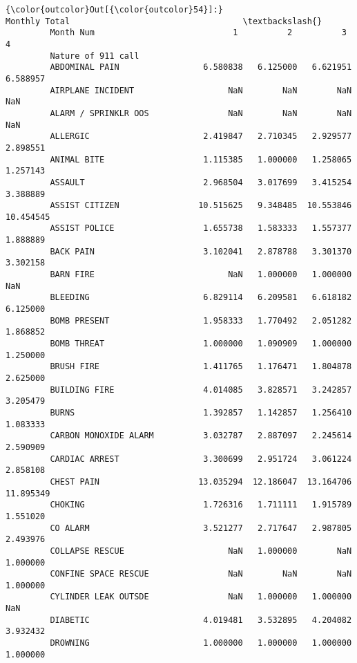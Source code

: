 \documentclass[11pt]{article}
\begin{document}
\begin{Verbatim}[commandchars=\\\{\}]
{\color{outcolor}Out[{\color{outcolor}54}]:}                           Monthly Total                                   \textbackslash{}
         Month Num                            1          2          3          4    
         Nature of 911 call                                                         
         ABDOMINAL PAIN                 6.580838   6.125000   6.621951   6.588957   
         AIRPLANE INCIDENT                   NaN        NaN        NaN        NaN   
         ALARM / SPRINKLR OOS                NaN        NaN        NaN        NaN   
         ALLERGIC                       2.419847   2.710345   2.929577   2.898551   
         ANIMAL BITE                    1.115385   1.000000   1.258065   1.257143   
         ASSAULT                        2.968504   3.017699   3.415254   3.388889   
         ASSIST CITIZEN                10.515625   9.348485  10.553846  10.454545   
         ASSIST POLICE                  1.655738   1.583333   1.557377   1.888889   
         BACK PAIN                      3.102041   2.878788   3.301370   3.302158   
         BARN FIRE                           NaN   1.000000   1.000000        NaN   
         BLEEDING                       6.829114   6.209581   6.618182   6.125000   
         BOMB PRESENT                   1.958333   1.770492   2.051282   1.868852   
         BOMB THREAT                    1.000000   1.090909   1.000000   1.250000   
         BRUSH FIRE                     1.411765   1.176471   1.804878   2.625000   
         BUILDING FIRE                  4.014085   3.828571   3.242857   3.205479   
         BURNS                          1.392857   1.142857   1.256410   1.083333   
         CARBON MONOXIDE ALARM          3.032787   2.887097   2.245614   2.590909   
         CARDIAC ARREST                 3.300699   2.951724   3.061224   2.858108   
         CHEST PAIN                    13.035294  12.186047  13.164706  11.895349   
         CHOKING                        1.726316   1.711111   1.915789   1.551020   
         CO ALARM                       3.521277   2.717647   2.987805   2.493976   
         COLLAPSE RESCUE                     NaN   1.000000        NaN   1.000000   
         CONFINE SPACE RESCUE                NaN        NaN        NaN   1.000000   
         CYLINDER LEAK OUTSDE                NaN   1.000000   1.000000        NaN   
         DIABETIC                       4.019481   3.532895   4.204082   3.932432   
         DROWNING                       1.000000   1.000000   1.000000   1.000000   

\end{Verbatim}
\end{document}
